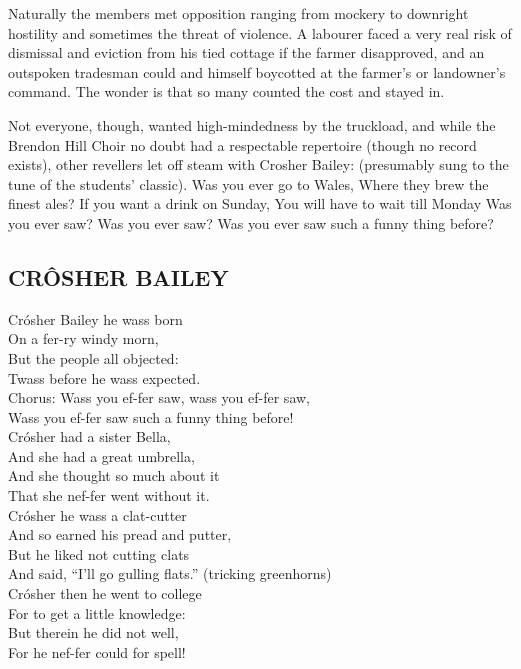 \documentclass[11pt]{book}
\begin{document}
Naturally the members met opposition ranging from mockery to downright hostility and sometimes the threat of violence. A labourer faced a very real risk of dismissal and eviction from his tied cottage if the farmer disapproved, and an outspoken tradesman could and himself boycotted at the farmer’s or landowner’s command. The wonder is that so many counted the cost and stayed in.

Not everyone, though, wanted high-mindedness by the truckload, and while the Brendon Hill Choir no doubt had a respectable repertoire (though no record exists), other revellers let off steam with Crosher Bailey:  (presumably sung to the tune of the students’ classic). 
  Was you ever go to Wales, Where they brew the finest ales? 
  If you want a drink on Sunday, You will have to wait till Monday
  Was you ever saw? Was you ever saw? Was you ever saw such a funny thing before?
 

\subsection{CRÔSHER BAILEY}

Crósher Bailey he wass born \\
On a fer-ry windy morn, \\
But the people all objected: \\
Twass before he wass expected. \\

Chorus: Wass you ef-fer saw, wass you ef-fer saw,  \\
   	Wass you ef-fer saw    such a funny thing before!  \\
Crósher had a sister Bella, \\
 		And she had a great umbrella, \\
And she thought so much about it \\
That she nef-fer went without it. \\

Crósher he wass a clat-cutter \\
And so earned his pread and putter,  \\
But he liked not cutting clats \\
And said, “I’ll go gulling flats.”  (tricking greenhorns) \\

Crósher then he went to college \\
For to get a little knowledge: \\
But therein he did not well, \\
For he nef-fer could for spell! \\
 	
\end{document}
